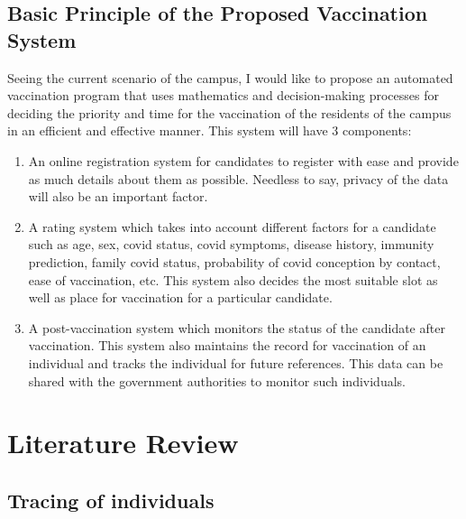\documentclass[10pt,twocolumn,letterpaper]{article}
\begin{document}
\subsection{Basic Principle of the Proposed Vaccination System}
Seeing the current scenario of the campus, I would like to propose an automated vaccination program that uses mathematics and decision-making processes for deciding the priority and time for the vaccination of the residents of the campus in an efficient and effective manner.  
This system will have 3 components:

\begin{enumerate}
	
	\item  An online registration system for candidates to register with ease and provide as much details about them as possible. Needless to say, privacy of the data will also be an important factor.
	\item A rating system which takes into account different factors for a candidate such as age, sex, covid status, covid symptoms, disease history, immunity prediction, family covid status, probability of covid conception by contact, ease of vaccination, etc. This system also decides the most suitable slot as well as place for vaccination for a particular candidate. 
	\item  A post-vaccination system which monitors the status of the candidate after vaccination. This system also maintains the record for vaccination of an individual and tracks the individual for future references. This data can be shared with the government authorities to monitor such individuals.
	        
\end{enumerate}

\section{Literature Review}

\subsection{Tracing of individuals}
\end{document}
